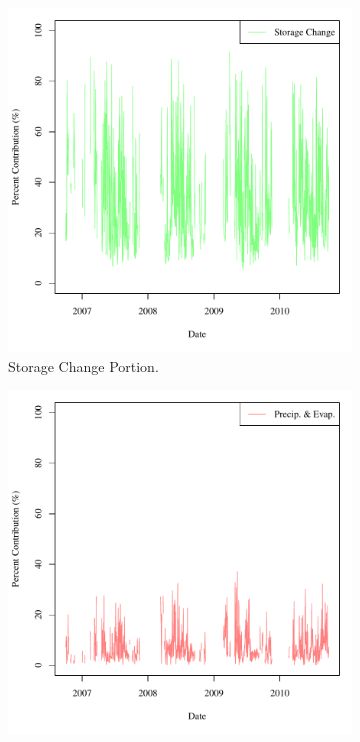 \begin{linenumbers}
\begin{figure}[htbp]
\begin{subfigure}{0.5\textwidth}
		\includegraphics[width=\tableCustomSize]{"Figures/Results_USR/Stochastic/M Water Contrib 3"}
		\caption{Storage Change Portion.}
	\end{subfigure}
	\tablevspace
	\begin{subfigure}{0.5\textwidth}
		\centering
		\includegraphics[width=\tableCustomSize]{"Figures/Results_USR/Stochastic/M Water Contrib 2"}

\end{subfigure}
\end{figure}
\end{linenumbers}
